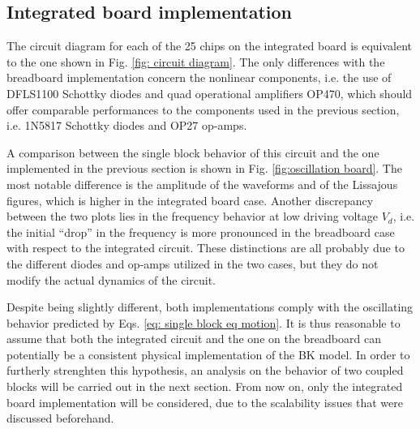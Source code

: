 
\subsection{Integrated board implementation}
\label{subsec:integrated board implementation}

The circuit diagram for each of the 25 chips on the integrated board is equivalent to the
one shown in Fig. \ref{fig: circuit diagram}. The only differences with the breadboard implementation
concern the nonlinear components, i.e. the use of DFLS1100 Schottky diodes and quad operational
amplifiers OP470, which should offer comparable performances to the components used in the previous section,
i.e. 1N5817 Schottky diodes and OP27 op-amps.

A comparison between the single block behavior of this circuit and the one implemented in the previous section
is shown in Fig. \ref{fig:oscillation board}. The most notable difference is the amplitude of the waveforms and of
the Lissajous figures, which is higher in the integrated board case. Another discrepancy between the two plots lies
in the frequency behavior at low driving voltage $V_d$, i.e. the initial ``drop'' in the frequency is more pronounced
in the breadboard case with respect to the integrated circuit. These distinctions are all probably due to the different diodes
and op-amps utilized in the two cases, but they do not modify the actual dynamics of the circuit.

Despite being slightly different, both implementations comply with the oscillating behavior predicted by
Eqs. \ref{eq: single block eq motion}. It is thus reasonable to assume that both the integrated circuit and the one on the
breadboard can potentially be a consistent physical implementation of the BK model. In order to furtherly strenghten
this hypothesis, an analysis on the behavior of two coupled blocks will be carried out in the next section.
From now on, only the integrated board implementation will be considered, due to the scalability issues that were discussed
beforehand.

